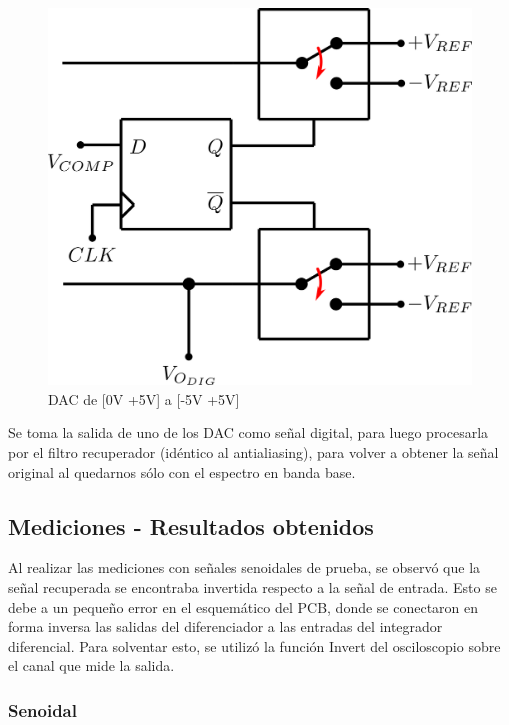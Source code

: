 \documentclass[assd_tp3_main.tex]{subfiles}
\begin{document}
\begin{figure}[!ht]
\begin{centering}
\includegraphics[scale=0.5]{images/ej5/DAC.png}
\par\end{centering}
\caption{DAC de [0V +5V] a [-5V +5V]}
\end{figure}

Se toma la salida de uno de los DAC como señal digital, para luego procesarla por el filtro recuperador (idéntico al antialiasing), para volver a obtener la señal original al quedarnos sólo con el espectro en banda base.
\newpage
\subsection{Mediciones - Resultados obtenidos}

Al realizar las mediciones con señales senoidales de prueba, se observó que la señal recuperada se encontraba invertida respecto a la señal de entrada. Esto se debe a un pequeño error en el esquemático del PCB, donde se conectaron en forma inversa las salidas del diferenciador a las entradas del integrador diferencial. Para solventar esto, se utilizó la función Invert del osciloscopio sobre el canal que mide la salida.

\subsubsection{Senoidal}
\end{document}
